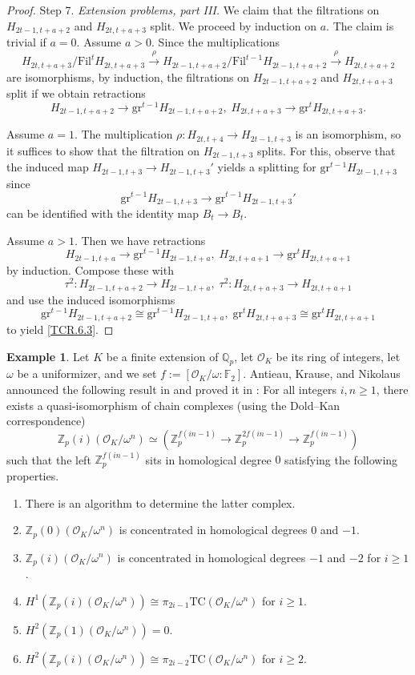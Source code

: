 \documentclass[10pt]{amsart}
\theoremstyle{definition}
\newtheorem{exm}[thm]{Example}
\numberwithin{equation}{section}
\newcommand{\F}{\mathbb{F}}
\newcommand{\Q}{\mathbb{Q}}
\newcommand{\Z}{\mathbb{Z}}
\newcommand{\cO}{\mathcal{O}}
\newcommand{\gr}{\mathrm{gr}}
\newcommand{\Fil}{\mathrm{Fil}}
\newcommand{\TC}{\mathrm{TC}}
\begin{document}
{\begin{proof}
Step 7. \emph{Extension problems, part III.}
We claim that the filtrations on $H_{2t-1,t+a+2}$ and $H_{2t,t+a+3}$ split.
We proceed by induction on $a$.
The claim is trivial if $a=0$.
Assume $a>0$.
Since the multiplications
\[
H_{2t,t+a+3} / \Fil^{t} H_{2t,t+a+3}
\xrightarrow{\rho} 
 H_{2t-1,t+a+2} / \Fil^{t-1} H_{2t-1,t+a+2}
\xrightarrow{\rho} 
 H_{2t,t+a+2}
\]
are isomorphisms,
by induction,
the filtrations on $H_{2t-1,t+a+2}$ and $H_{2t,t+a+3}$ split if we obtain retractions
\begin{equation}
\label{TCR.6.3}
H_{2t-1,t+a+2}\to \gr^{t-1} H_{2t-1,t+a+2},
\;
H_{2t,t+a+3}\to \gr^t H_{2t,t+a+3}.
\end{equation}



Assume $a=1$.
The multiplication $\rho\colon H_{2t,t+4}\to H_{2t-1,t+3}$ is an isomorphism,
so it suffices to show that the filtration on $H_{2t-1,t+3}$ splits.
For this,
observe that the induced map $H_{2t-1,t+3}\to H_{2t-1,t+3}'$ yields a splitting for $\gr^{t-1} H_{2t-1,t+3}$ since
\[
\gr^{t-1} H_{2t-1,t+3}\to \gr^{t-1} H_{2t-1,t+3}'
\]
can be identified with the identity map $B_t\to B_t$.

Assume $a>1$.
Then we have retractions
\[
H_{2t-1,t+a}\to \gr^{t-1} H_{2t-1,t+a},
\;
H_{2t,t+a+1}\to \gr^t H_{2t,t+a+1}
\]
by induction.
Compose these with
\[
\tau^2\colon H_{2t-1,t+a+2}\to H_{2t-1,t+a},
\;
\tau^2\colon H_{2t,t+a+3}\to H_{2t,t+a+1}
\]
and use the induced isomorphisms
\[
\gr^{t-1} H_{2t-1,t+a+2}\cong \gr^{t-1} H_{2t-1,t+a},
\;
\gr^{t} H_{2t,t+a+3}\cong \gr^t  H_{2t,t+a+1}
\]
to yield \eqref{TCR.6.3}.
\end{proof}

\begin{exm}
\label{TCR.3}
Let $K$ be a finite extension of $\Q_p$,
let $\cO_K$ be its ring of integers,
let $\omega$ be a uniformizer,
and we set $f:=[\cO_K/\omega:\F_2]$.
Antieau, Krause, and Nikolaus announced the following result in \cite[\S 2]{2204.03420} and proved it in \cite{AKN}:
For all integers $i,n\geq 1$,
there exists a quasi-isomorphism of chain complexes (using the Dold--Kan correspondence)
\[
\Z_p(i)(\cO_K/\omega^n)
\simeq
(\Z_p^{f(in-1)}\to \Z_p^{2f(in-1)}\to \Z_p^{f(in-1)})
\]
such that the left $\Z_p^{f(in-1)}$ sits in homological degree $0$ satisfying the following properties.
\begin{enumerate}
\item[(1)] There is an algorithm to determine the latter complex.
\item[(2)] $\Z_p(0)(\cO_K/\omega^n)$ is concentrated in homological degrees $0$ and $-1$.
\item[(3)] $\Z_p(i)(\cO_K/\omega^n)$ is concentrated in homological degrees $-1$ and $-2$ for $i\geq 1$.
\item[(4)]
\(
H^1(\Z_p(i)(\cO_K/\omega^n))
\cong
\pi_{2i-1}\TC(\cO_K/\omega^n)
\) for $i\geq 1$.
\item[(5)]
\(
H^2(\Z_p(1)(\cO_K/\omega^n))
=0.
\)
\item[(6)]
\(
H^2(\Z_p(i)(\cO_K/\omega^n))
\cong
\pi_{2i-2}\TC(\cO_K/\omega^n)
\) for $i\geq 2$.
\end{enumerate}



\end{exm}}
\end{document}
